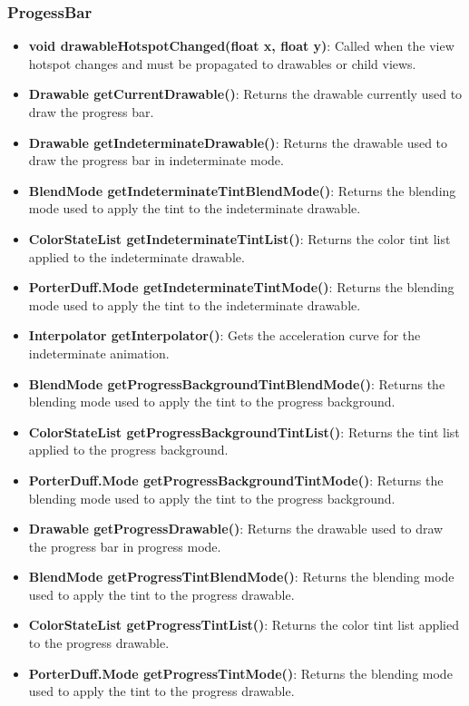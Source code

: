 \documentclass{report}
\begin{document}
\begin{itemize}
    \subsubsection{ProgessBar}
    \begin{itemize}
        \item \textbf{void drawableHotspotChanged(float x, float y)}: Called when the view hotspot changes and must be propagated to drawables or child views.
        \item \textbf{Drawable getCurrentDrawable()}: Returns the drawable currently used to draw the progress bar.
        \item \textbf{Drawable getIndeterminateDrawable()}: Returns the drawable used to draw the progress bar in indeterminate mode.
        \item \textbf{BlendMode getIndeterminateTintBlendMode()}: Returns the blending mode used to apply the tint to the indeterminate drawable.
        \item \textbf{ColorStateList getIndeterminateTintList()}: Returns the color tint list applied to the indeterminate drawable.
        \item \textbf{PorterDuff.Mode getIndeterminateTintMode()}: Returns the blending mode used to apply the tint to the indeterminate drawable.
        \item \textbf{Interpolator getInterpolator()}: Gets the acceleration curve for the indeterminate animation.
        \item \textbf{BlendMode getProgressBackgroundTintBlendMode()}: Returns the blending mode used to apply the tint to the progress background.
        \item \textbf{ColorStateList getProgressBackgroundTintList()}: Returns the tint list applied to the progress background.
        \item \textbf{PorterDuff.Mode getProgressBackgroundTintMode()}: Returns the blending mode used to apply the tint to the progress background.
        \item \textbf{Drawable getProgressDrawable()}: Returns the drawable used to draw the progress bar in progress mode.
        \item \textbf{BlendMode getProgressTintBlendMode()}: Returns the blending mode used to apply the tint to the progress drawable.
        \item \textbf{ColorStateList getProgressTintList()}: Returns the color tint list applied to the progress drawable.
        \item \textbf{PorterDuff.Mode getProgressTintMode()}: Returns the blending mode used to apply the tint to the progress drawable.

\end{itemize}
\end{itemize}
\end{document}
